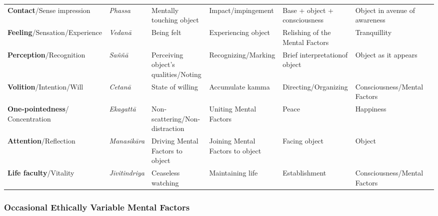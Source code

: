\documentclass[a4 paper, 12pt]{article}
\begin{document}
\begin{tabular}{P{0.21\textwidth} | C{.13\textwidth} C{.165\textwidth} C{0.165\textwidth} C{0.165\textwidth} C{0.165\textwidth} m{0mm}}
\toprule
 &  &  &  &  & \\
\midrule
\textbf{Contact}/\newline Sense impression & \textit{Phassa} & Mentally touching object & Impact/\newline impingement & Base + object + consciousness & Object in avenue of awareness &\\[9mm]
\textbf{Feeling}/\newline Sensation/Experience & \textit{Vedanā} & Being felt & Experiencing object & Relishing of the Mental Factors & Tranquillity &\\[9mm]
\textbf{Perception}/\newline Recognition & \textit{Saññā} & Perceiving object’s qualities/\newline Noting & Recognizing/\newline Marking & Brief interpretation\newline of object & Object as it appears &\\[9mm]
\textbf{Volition}/\newline Intention/Will & \textit{Cetanā} & State of willing & Accumulate kamma & Directing/\newline Organizing & Consciousness/\newline Mental Factors &\\[9mm]
\textbf{One-pointedness}/ Concentration & \textit{Ekagattā} & Non-scattering/\newline Non-distraction & Uniting Mental Factors & Peace & Happiness &\\[9mm]
\textbf{Attention}/\newline Reflection & \textit{Manasikāra} & Driving Mental Factors to object & Joining Mental Factors to object & Facing object & Object &\\[9mm]
\textbf{Life faculty}/\newline Vitality & \textit{Jīvitindriya} & Ceaseless watching & Maintaining life & Establishment & Consciousness/\newline Mental Factors &\\[9mm]
\bottomrule
\end{tabular} 

\subsubsection*{Occasional Ethically Variable Mental Factors}
\end{document}
